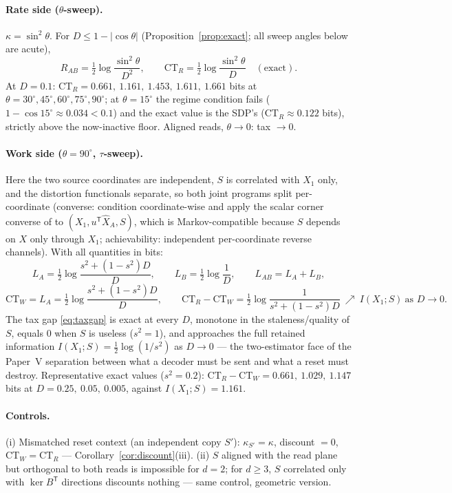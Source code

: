 \documentclass[11pt]{article}
\newcommand{\hX}{\widehat X}\newcommand{\hY}{\widehat Y}
\begin{document}
\paragraph{Rate side ($\theta$-sweep).} $\kappa=\sin^2\theta$. For
$D\le1-\lvert\cos\theta\rvert$ (Proposition~\ref{prop:exact}; all sweep
angles below are acute),
\[
R_{AB}=\tfrac12\log\frac{\sin^2\theta}{D^2},
\qquad
\mathrm{CT}_R=\tfrac12\log\frac{\sin^2\theta}{D}\quad(\text{exact}).
\]
At $D=0.1$: $\mathrm{CT}_R=0.661,\ 1.161,\ 1.453,\ 1.611,\ 1.661$ bits at
$\theta=30^\circ,45^\circ,60^\circ,75^\circ,90^\circ$; at $\theta=15^\circ$
the regime condition fails ($1-\cos15^\circ\approx0.034<0.1$) and the exact
value is the SDP's ($\mathrm{CT}_R\approx0.122$ bits), strictly above the
now-inactive floor. Aligned reads, $\theta\to0$: tax $\to0$.

\paragraph{Work side ($\theta=90^\circ$, $\tau$-sweep).} Here the two source
coordinates are independent, $S$ is correlated with $X_1$ only, and the
distortion functionals separate, so both joint programs split
per-coordinate (converse: condition coordinate-wise and apply the scalar
corner converse of \cite{bondlandauerV} to
$(X_1,u^{\mathsf T}\hX_A,S)$, which is Markov-compatible because $S$ depends
on $X$ only through $X_1$; achievability: independent per-coordinate reverse
channels). With all quantities in bits:
\[
L_A=\tfrac12\log\frac{s^2+(1-s^2)D}{D},\qquad
L_B=\tfrac12\log\frac1D,\qquad
L_{AB}=L_A+L_B,
\]
\begin{equation}
\mathrm{CT}_W=L_A
=\tfrac12\log\frac{s^2+(1-s^2)D}{D},
\qquad
\mathrm{CT}_R-\mathrm{CT}_W
=\tfrac12\log\frac{1}{s^2+(1-s^2)D}
\ \nearrow\ I(X_1;S)\ \text{as }D\to0 .
\label{eq:taxgap}
\end{equation}
The tax gap \eqref{eq:taxgap} is exact at every $D$, monotone in the
staleness/quality of $S$, equals $0$ when $S$ is useless ($s^2=1$), and
approaches the full retained information $I(X_1;S)=\tfrac12\log(1/s^2)$ as
$D\to0$ --- the two-estimator face of the Paper~V separation between what a
decoder must be sent and what a reset must destroy. Representative exact
values ($s^2=0.2$): $\mathrm{CT}_R-\mathrm{CT}_W=0.661,\ 1.029,\ 1.147$
bits at $D=0.25,\ 0.05,\ 0.005$, against $I(X_1;S)=1.161$.

\paragraph{Controls.} (i) Mismatched reset context (an independent copy
$S'$): $\kappa_{S'}=\kappa$, discount $=0$, $\mathrm{CT}_W=\mathrm{CT}_R$
--- Corollary~\ref{cor:discount}(iii). (ii) $S$ aligned with the read plane
but orthogonal to both reads is impossible for $d=2$; for $d\ge3$, $S$
correlated only with $\ker B^{\mathsf T}$ directions discounts nothing ---
same control, geometric version.
\end{document}
